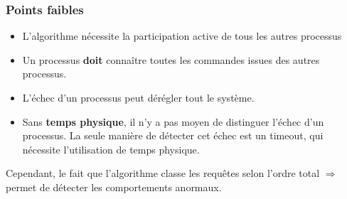 \documentclass[compress]{beamer}
\begin{document}
\begin{frame}
\frametitle{Points faibles}
\begin{itemize}
\item L'algorithme nécessite la participation active de tous les autres processus
\item Un processus \textbf{doit} connaître toutes les commandes issues des autres processus. 
\item L'échec d'un processus peut dérégler tout le système.
\item Sans \textbf{\color{cyan} temps physique}, il n'y a pas moyen de distinguer l'échec d'un processus. La seule manière de détecter cet échec est un timeout, qui nécessite l'utilisation de temps physique.
\end{itemize}
Cependant, le fait que l'algorithme classe les requêtes selon l'ordre total $\Rightarrow$ permet de détecter les comportements anormaux.
\end{frame}

\end{document}
